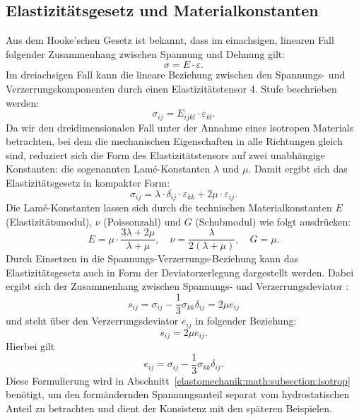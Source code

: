 \subsection{Elastizitätsgesetz und Materialkonstanten}
Aus dem Hooke’schen Gesetz ist bekannt, dass im einachsigen, linearen Fall folgender Zusammenhang zwischen Spannung und Dehnung gilt:
\begin{equation*}
	\sigma = 
	E \cdot \varepsilon.
\end{equation*}
Im dreiachsigen Fall kann die lineare Beziehung zwischen den Spannungs- und Verzerrungskomponenten durch einen Elastizitätstensor 4. Stufe beschrieben werden:
\begin{equation*}
	\sigma_{ij} = 
	E_{ijkl} \cdot \varepsilon_{kl}.
\end{equation*}
Da wir den dreidimensionalen Fall unter der Annahme eines isotropen Materials betrachten, bei dem die mechanischen Eigenschaften in alle Richtungen gleich sind, reduziert sich die Form des Elastizitätstensors auf zwei unabhängige Konstanten: die sogenannten Lamé-Konstanten $\lambda$ und $\mu$. 
Damit ergibt sich das Elastizitätsgesetz in kompakter Form:
\begin{equation*}
	\sigma_{ij} = 
	\lambda \cdot \delta_{ij} \cdot \varepsilon_{kk} + 2\mu \cdot \varepsilon_{ij}.
\end{equation*}
Die Lamé-Konstanten lassen sich durch die technischen Materialkonstanten $E$ (Elastizitätsmodul), $\nu$ (Poissonzahl) und $G$ (Schubmodul) wie folgt ausdrücken:
\begin{equation*}
	E = 
	\mu \cdot \frac{3\lambda + 2\mu}{\lambda + \mu}, \quad 
	\nu = 
	\frac{\lambda}{2(\lambda + \mu)}, \quad 
	G = 
	\mu.
\end{equation*}
Durch Einsetzen in die Spannungs-Verzerrungs-Beziehung kann das Elastizitätsgesetz auch in Form der Deviatorzerlegung dargestellt werden. 
Dabei ergibt sich der Zusammenhang zwischen Spannungs- und Verzerrungsdeviator
\cite{elastomechanik:Grundlagen_der_Elastizitaetstheorie}:
\begin{equation*}
	s_{ij} = 
	\sigma_{ij} - \frac{1}{3} \sigma_{kk} \delta_{ij} = 
	2\mu e_{ij}
\end{equation*}
und steht über den Verzerrungsdeviator $e_{ij}$ in folgender Beziehung:
\begin{equation*}
	s_{ij} = 
	2\mu e_{ij}.
\end{equation*}
Hierbei gilt
\begin{equation*}
	e_{ij} = 
	\sigma_{ij} - \frac{1}{3} \sigma_{kk} \delta_{ij}.
\end{equation*}
Diese Formulierung wird in
Abschnitt~\ref{elastomechanik:math:subsection:isotrop}
benötigt, um den formändernden Spannungsanteil separat vom hydrostatischen Anteil zu betrachten und dient der Konsistenz mit den späteren Beispielen.
